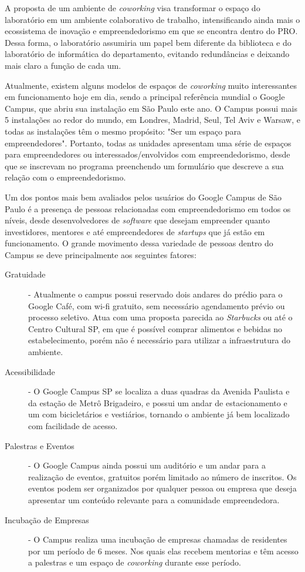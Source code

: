 A proposta de um ambiente de \textit{coworking} visa transformar o espaço do laboratório em um ambiente colaborativo de trabalho, intensificando ainda mais o ecossistema de inovação e empreendedorismo em que se encontra dentro do PRO. Dessa forma, o laboratório assumiria um papel bem diferente da biblioteca e do laboratório de informática do departamento, evitando redundâncias e deixando mais claro a função de cada um.

Atualmente, existem alguns modelos de espaços de \textit{coworking} muito interessantes em funcionamento hoje em dia, sendo a principal referência mundial o Google Campus, que abriu sua instalação em São Paulo este ano. O Campus possui mais 5 instalações ao redor do mundo, em Londres, Madrid, Seul,  Tel Aviv e Warsaw, e todas as instalações têm o mesmo propósito: "Ser um espaço para empreendedores". Portanto, todas as unidades apresentam uma série de espaços para empreendedores ou interessados/envolvidos com empreendedorismo, desde que se inscrevam no programa preenchendo um formulário que descreve a sua relação com o empreendedorismo.

Um dos pontos mais bem avaliados pelos usuários do Google Campus de São Paulo é a presença de pessoas relacionadas com empreendedorismo em todos os níveis, desde desenvolvedores de \textit{software} que desejam empreender quanto investidores, mentores e até empreendedores de \textit{startups} que já estão em funcionamento. O grande movimento dessa variedade de pessoas dentro do Campus se deve principalmente aos seguintes fatores: 

\begin{description}
\item[Gratuidade] - Atualmente o campus possui reservado dois andares do prédio para o Google Café, com wi-fi gratuito, sem necessário agendamento prévio ou processo seletivo. Atua com uma proposta parecida ao \textit{Starbucks} ou até o Centro Cultural SP, em que é possível comprar alimentos e bebidas no estabelecimento, porém não é necessário para utilizar a infraestrutura do ambiente.

\item[Acessibilidade] - O Google Campus SP se localiza a duas quadras da Avenida Paulista e da estação de Metrô Brigadeiro, e possui um andar de estacionamento e um com bicicletários e vestiários, tornando o ambiente já bem localizado com facilidade de acesso.

\item[Palestras e Eventos] - O Google Campus ainda possui um auditório e um andar para a realização de eventos, gratuitos porém limitado ao número de inscritos. Os eventos podem ser organizados por qualquer pessoa ou empresa que deseja apresentar um conteúdo relevante para a comunidade empreendedora.

\item[Incubação de Empresas] - O Campus realiza uma incubação de empresas chamadas de residentes por um período de 6 meses. Nos quais elas recebem mentorias e têm acesso a palestras e um espaço de \textit{coworking} durante esse período.
\end{description}

